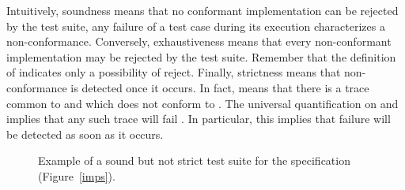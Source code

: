 \documentclass{LMCS}
\theoremstyle{plain}\newtheorem{proposition}[thm]{Proposition}
\begin{document}
Intuitively, soundness means that no conformant implementation can be
rejected by the test suite, \ie any failure of a test case during its
execution characterizes a non-conformance.  Conversely, exhaustiveness means
that every non-conformant implementation may be rejected by the test
suite.  Remember that the definition of 
indicates only a possibility of reject.  Finally, strictness means
that non-conformance is detected once it occurs.  In fact,  means that there is a trace common to 
and  which does not conform to .  The universal
quantification on  and  implies that any such trace will
fail . In particular, this implies that failure will be detected
as soon as it occurs.  





\begin{center}
\begin{figure}[hbt]
 \begin{minipage}{0.5\textwidth}

 \end{minipage}
 \caption{Example of a sound but not strict test suite for the specification  (Figure~\ref{imps}).}\label{ex_sound}\end{figure}   
 \end{center}
\end{document}

